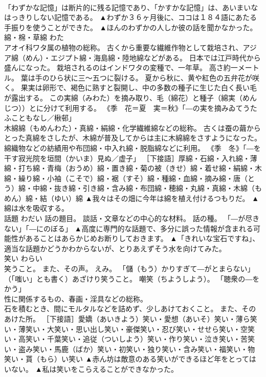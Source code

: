 \documentclass[8pt]{extreport}
\begin{document}
\begin{CJK}{UTF8}{min}
\\	「わずかな記憶」は断片的に残る記憶であり、「かすかな記憶」は、あいまいなはっきりしない記憶である。	▲わずか３６ヶ月後に、ココは１８４語にあたる手振りを使うことができた。 ▲ほんのわずかの人しか彼の話を聞かなかった。
\\	綿・棉・草綿	わた	
\\	アオイ科ワタ属の植物の総称。 古くから重要な繊維作物として栽培され、アジア綿（めん）・エジプト綿・海島綿・陸地綿などがある。 日本では江戸時代から盛んになった。 栽培されるのはインドワタの変種で、一年草。 高さ約一メートル。 葉は手のひら状に三〜五つに裂ける。 夏から秋に、黄や紅色の五弁花が咲く。 果実は卵形で、褐色に熟すと裂開し、中の多数の種子に生じた白く長い毛が露出する。 この実綿（みわた）を摘み取り、毛（綿花）と種子（綿実（めんじつ））とに分けて利用する。 《季　花＝夏　実＝秋》「―の実を摘みゐてうたふこともなし／楸邨」 
\\	木綿綿（もめんわた）・真綿・絹綿・化学繊維綿などの総称。 古くは蚕の繭からとった真綿をさしたが、木綿が普及してからは主に木綿綿をさすようになった。 綿織物などの紡績用や布団綿・中入れ綿・脱脂綿などに利用。 《季　冬》「―を干す寂光院を垣間（かいま）見ぬ／虚子」 ［下接語］厚綿・石綿・入れ綿・薄綿・打ち綿・青梅（おうめ）綿・置き綿・菊の被（きせ）綿・着せ綿・絹綿・木綿・繰り綿・小袖（こそで）綿・裾（すそ）綿・種綿・血綿・摘み綿・唐（とう）綿・中綿・抜き綿・引き綿・含み綿・布団綿・穂綿・丸綿・真綿・木綿（もめん）綿・結（ゆい）綿	▲我々はその畑に今年は綿を植え付けるつもりだ。 ▲綿は水を吸収する。
\\	話題	わだい	話の題目。 談話・文章などの中心的な材料。 話の種。 「―が尽きない」「―にのぼる」	▲高度に専門的な話題で、多分に誤った情報が含まれる可能性があることはあらかじめお断りしておきます。 ▲「きれいな宝石ですね」、適当な話題かどうかわからないが、とりあえずそう水を向けてみた。
\\	笑い	わらい	
\\	笑うこと。 また、その声。 えみ。 「儲（もう）かりすぎて―がとまらない」 
\\	（「嗤い」とも書く）あざけり笑うこと。 嘲笑（ちようしよう）。 「聴衆の―をかう」 
\\	性に関係するもの、春画・淫具などの総称。 
\\	石を積むとき、間にモルタルなどを詰めず、少しあけておくこと。 また、そのあけた所。 ［下接語］愛嬌（あいきよう）笑い・愛想（あいそ）笑い・薄ら笑い・薄笑い・大笑い・思い出し笑い・豪傑笑い・忍び笑い・せせら笑い・空笑い・高笑い・千葉笑い・追従（ついしよう）笑い・作り笑い・泣き笑い・苦笑い・盗み笑い・馬鹿（ばか）笑い・初笑い・独り笑い・含み笑い・福笑い・物笑い・貰（もら）い笑い	▲赤ん坊は敵意のある笑いができるほど年をとってはいない。 ▲私は笑いをこらえることができなかった。

\end{CJK}
\end{document}
